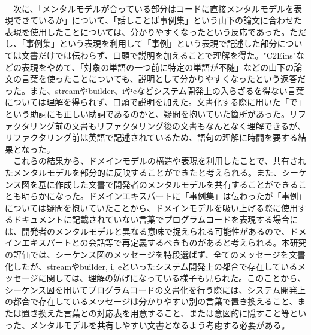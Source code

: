 \documentclass[12pt, a4paper]{jreport}
\begin{document}
\\　次に、「メンタルモデルが合っている部分はコードに直接メンタルモデルを表現できているか」について、「話しことば事例集」という山下の論文に合わせた表現を使用したことについては、分かりやすくなったという反応であった。ただし、「事例集」という表現を利用して「事例」という表現で記述した部分については文書だけでは伝わらず、口頭で説明を加えることで理解を得た。"C2Eins"などの表現をやめて、「対象の単語の一つ前に特定の単語が不随」などの山下の論文の言葉を使ったことについても、説明として分かりやすくなったという返答だった。また、streamやbuilder、iやeなどシステム開発上の入らざるを得ない言葉については理解を得られず、口頭で説明を加えた。文書化する際に用いた「で」という助詞にも正しい助詞であるのかと、疑問を抱いていた箇所があった。リファクタリング前の文書もリファクタリング後の文書もなんとなく理解できるが、リファクタリング前は英語で記述されているため、語句の理解に時間を要する結果となった。
\\　これらの結果から、ドメインモデルの構造や表現を利用したことで、共有されたメンタルモデルを部分的に反映することができたと考えられる。また、シーケンス図を基に作成した文書で開発者のメンタルモデルを共有することができることも明らかになった。ドメインエキスパートに「事例集」は伝わったが「事例」については疑問を抱いていたことから、ドメインモデルを吸い上げる際に使用するドキュメントに記載されていない言葉でプログラムコードを表現する場合には、開発者のメンタルモデルと異なる意味で捉えられる可能性があるので、ドメインエキスパートとの会話等で再定義するべきものがあると考えられる。本研究の評価では、シーケンス図のメッセージを特段選ばず、全てのメッセージを文書化したが、streamやbuilder, i, eといったシステム開発上の都合で存在しているメッセージに関しては、理解の妨げになっている様子も見られた。このことから、シーケンス図を用いてプログラムコードの文書化を行う際には、システム開発上の都合で存在しているメッセージは分かりやすい別の言葉で置き換えること、または置き換えた言葉との対応表を用意すること、または意図的に隠すこと等といった、メンタルモデルを共有しやすい文書となるよう考慮する必要がある。
\end{document}
